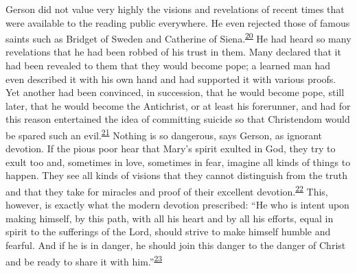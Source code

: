 Gerson did not value very highly the visions and revelations of
\protect\hypertarget{15_Chapter_Eight__RELIGIOUS_EXCITAT.xhtmlux5cux23page_225}{}{}recent
times that were available to the reading public everywhere. He even
rejected those of famous saints such as Bridget of Sweden and Catherine
of
Siena.\textsuperscript{\protect\hypertarget{15_Chapter_Eight__RELIGIOUS_EXCITAT.xhtmlux5cux23id_867}{\protect\hyperlink{23_NOTES.xhtmlux5cux23id_868}{20}}}
He had heard so many revelations that he had been robbed of his trust in
them. Many declared that it had been revealed to them that they would
become pope; a learned man had even described it with his own hand and
had supported it with various proofs. Yet another had been convinced, in
succession, that he would become pope, still later, that he would become
the Antichrist, or at least his forerunner, and had for this reason
entertained the idea of committing suicide so that Christendom would be
spared such an
evil.\textsuperscript{\protect\hypertarget{15_Chapter_Eight__RELIGIOUS_EXCITAT.xhtmlux5cux23id_865}{\protect\hyperlink{23_NOTES.xhtmlux5cux23id_866}{21}}}
Nothing is so dangerous, says Gerson, as ignorant devotion. If the pious
poor hear that Mary's spirit exulted in God, they try to exult too and,
sometimes in love, sometimes in fear, imagine all kinds of things to
happen. They see all kinds of visions that they cannot distinguish from
the truth and that they take for miracles and proof of their excellent
devotion.\textsuperscript{\protect\hypertarget{15_Chapter_Eight__RELIGIOUS_EXCITAT.xhtmlux5cux23id_863}{\protect\hyperlink{23_NOTES.xhtmlux5cux23id_864}{22}}}
This, however, is exactly what the modern devotion prescribed: ``He who
is intent upon making himself, by this path, with all his heart and by
all his efforts, equal in spirit to the sufferings of the Lord, should
strive to make himself humble and fearful. And if he is in danger, he
should join this danger to the danger of Christ and be ready to share it
with
him.''\textsuperscript{\protect\hypertarget{15_Chapter_Eight__RELIGIOUS_EXCITAT.xhtmlux5cux23id_861}{\protect\hyperlink{23_NOTES.xhtmlux5cux23id_862}{23}}}

